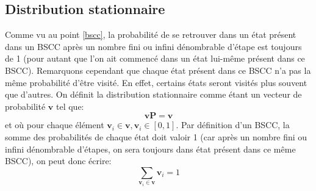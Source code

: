 \documentclass[letterpaper]{article}
\begin{document}
  \subsection{Distribution stationnaire}
    \label{distribution_stationnaire}
    Comme vu au point \ref{bscc}, la probabilité de se retrouver dans un état
    présent dans un BSCC après un nombre fini ou infini dénombrable d'étape est
    toujours de 1 (pour autant que l'on ait commencé dans un état lui-même présent
    dans ce BSCC).  Remarquons cependant que chaque état présent dans ce BSCC n'a 
    pas la même probabilité d'être visité.  En effet, certains états seront 
    visités plus souvent que d'autres.
    On définit la distribution stationnaire comme étant un vecteur de probabilité
    $\mathbf{v}$ tel que:
    $$\mathbf{v}\mathbf{P} = \mathbf{v}$$
    et où pour chaque élément $\mathbf{v}_i \in \mathbf{v}, \mathbf{v}_i \in [0, 1]$.
    Par définition d'un BSCC, la somme des probabilités de chaque état doit valoir 1
    (car après un nombre fini ou infini dénombrable d'étapes, on sera toujours dans
    état présent dans ce même BSCC), on peut donc écrire:
    $$\sum\limits_{\mathbf{v}_i \in \mathbf{v}} \mathbf{v}_i = 1$$
    
\end{document}
